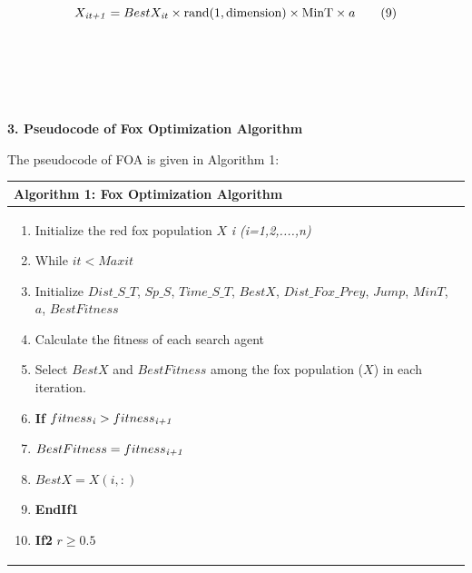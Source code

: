 \documentclass[
]{article}
\begin{document}
\begin{justify}
{\begin{equation}
X_{\text{\textit{it+1}}} = BestX_{\text{\textit{it}}} \times \text{rand}(1,\text{dimension}) \times \text{MinT} \times a \tag{9}
\end{equation}

\\\\\\\

\def\labelenumi{\arabic{enumi}.}
\item
\vspace{5mm}
  \textbf{3. Pseudocode of Fox Optimization Algorithm}

The pseudocode of FOA is given in Algorithm 1:

\begin{longtable}{@{}p{\dimexpr\linewidth-2\tabcolsep\relax}@{}}
\toprule
\begin{minipage}[b]{\linewidth}
\raggedright
\textbf{Algorithm 1: Fox Optimization Algorithm}
\end{minipage} \\
\midrule
\endhead
\begin{minipage}[t]{\linewidth}
\raggedright
\begin{enumerate}
  \item Initialize the red fox population $X$ \textit{i (i=1,2,....,n)}
  \item While $it < Maxit$
  \item \hspace{0.5cm} Initialize $Dist\_S\_T$, $Sp\_S$, $Time\_S\_T$, $BestX$, $Dist\_Fox\_Prey$, $Jump$, $MinT$, $a$, $BestFitness$
  \item \hspace{0.5cm} Calculate the fitness of each search agent
  \item \hspace{0.5cm} Select $BestX$ and $BestFitness$ among the fox population ($X$) in each iteration.
  \item \hspace{0.5cm} \textbf{If} $fitness_{\text{\textit{i}}} > fitness_{\text{\textit{i+1}}}$ 
  \item \hspace{1cm} $BestFitness = fitness_{\text{\textit{i+1}}}$
  \item \hspace{1cm} $BestX=X(i, :)$
  \item \hspace{0.5cm} \textbf{EndIf1}
  \item \hspace{0.5cm} \textbf{If2} $r \geq 0.5$ 

\end{enumerate}
\end{minipage}
\end{longtable}}
\end{justify}
\end{document}
